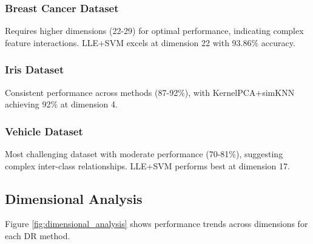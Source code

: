 \documentclass[12pt,a4paper]{article}
\begin{document}
\subsubsection{Breast Cancer Dataset} 
Requires higher dimensions (22-29) for optimal performance, indicating complex feature interactions. LLE+SVM excels at dimension 22 with 93.86\% accuracy.

\subsubsection{Iris Dataset}
Consistent performance across methods (87-92\%), with KernelPCA+simKNN achieving 92\% at dimension 4.

\subsubsection{Vehicle Dataset}
Most challenging dataset with moderate performance (70-81\%), suggesting complex inter-class relationships. LLE+SVM performs best at dimension 17.

\subsection{Dimensional Analysis}

Figure \ref{fig:dimensional_analysis} shows performance trends across dimensions for each DR method.
\end{document}
